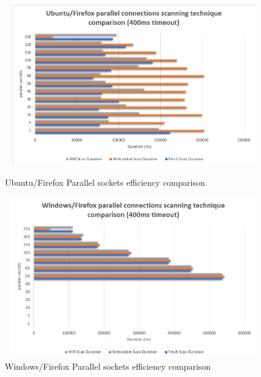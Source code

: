 \begin{figure}[ht]
\begin{adjustwidth}{-3cm}{-1cm}
\centering
\begin{minipage}{.45\textwidth}
  \centering
\includegraphics[width=15cm, height=7cm, keepaspectratio]{port_scanning_techniques/img/ubuntu_firefox_scan_technique_comparison.png}
    \caption{Ubuntu/Firefox Parallel sockets efficiency comparison}
    \label{fig:ubuntu_firefox_n_sockets}
\end{minipage}
\hspace{0.5cm} %
\begin{minipage}{.45\textwidth}
\includegraphics[width=15cm, height=7cm, keepaspectratio]{port_scanning_techniques/img/windows_firefox_scan_technique_comparison.png}
    \caption{Windows/Firefox Parallel sockets efficiency comparison}
    \label{fig:windows_firefox_n_sockets}
\end{minipage}
\end{adjustwidth}
\end{figure}